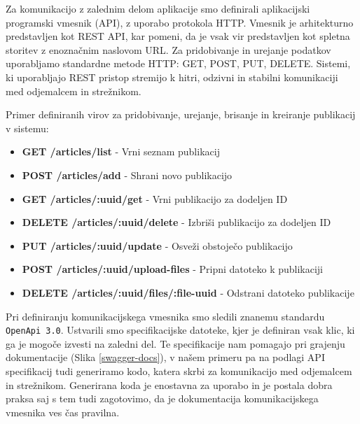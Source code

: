 Za komunikacijo z zalednim delom aplikacije smo definirali aplikacijski programski vmesnik (API), z uporabo protokola HTTP. Vmesnik je arhitekturno predstavljen kot REST API, kar pomeni, da je vsak vir predstavljen kot spletna storitev z enoznačnim naslovom URL. Za pridobivanje in urejanje podatkov uporabljamo standardne metode HTTP: GET, POST, PUT, DELETE. Sistemi, ki uporabljajo REST pristop stremijo k hitri, odzivni in stabilni komunikaciji med odjemalcem in strežnikom.

Primer definiranih virov za pridobivanje, urejanje, brisanje in kreiranje publikacij v sistemu:
\begin{description}

\begin{itemize}
\item \textbf{GET /articles/list} - Vrni seznam publikacij
\item \textbf{POST /articles/add} - Shrani novo publikacijo
\item \textbf{GET /articles/:uuid/get} - Vrni publikacijo za dodeljen ID
\item \textbf{DELETE /articles/:uuid/delete} - Izbriši publikacijo za dodeljen ID
\item \textbf{PUT /articles/:uuid/update} - Osveži obstoječo publikacijo
\item \textbf{POST /articles/:uuid/upload-files} - Pripni datoteko k publikaciji
\item \textbf{DELETE /articles/:uuid/files/:file-uuid} - Odstrani datoteko publikacije
\end{itemize}
\end{description}

Pri definiranju komunikacijskega vmesnika smo sledili znanemu standardu \verb=OpenApi 3.0=. Ustvarili smo specifikacijske datoteke, kjer je definiran vsak klic, ki ga je mogoče izvesti na zaledni del. Te specifikacije nam pomagajo pri grajenju dokumentacije (Slika \ref{swagger-docs}), v našem primeru pa na podlagi API specifikacij tudi generiramo kodo, katera skrbi za komunikacijo med odjemalcem in strežnikom. Generirana koda je enostavna za uporabo in je postala dobra praksa saj s tem tudi zagotovimo, da je dokumentacija komunikacijskega vmesnika ves čas pravilna.

